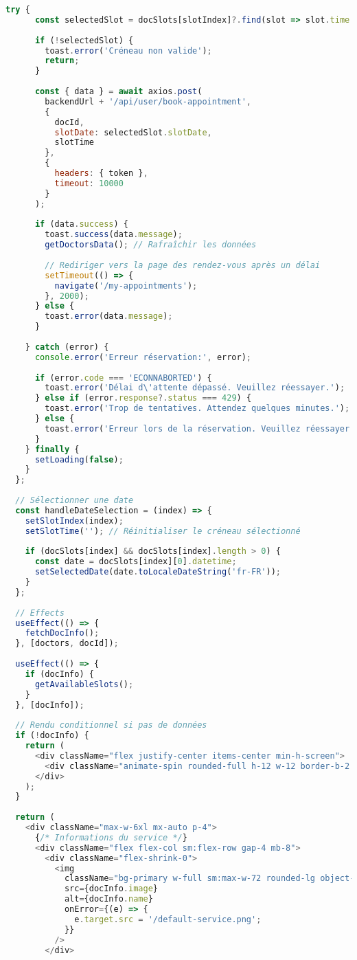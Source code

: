 \begin{lstlisting}[language=JavaScript, caption=AppointmentForm.jsx - Formulaire de réservation avec validation]
    try {
      const selectedSlot = docSlots[slotIndex]?.find(slot => slot.time === slotTime);
      
      if (!selectedSlot) {
        toast.error('Créneau non valide');
        return;
      }
      
      const { data } = await axios.post(
        backendUrl + '/api/user/book-appointment', 
        { 
          docId, 
          slotDate: selectedSlot.slotDate, 
          slotTime 
        }, 
        { 
          headers: { token },
          timeout: 10000
        }
      );
      
      if (data.success) {
        toast.success(data.message);
        getDoctorsData(); // Rafraîchir les données
        
        // Rediriger vers la page des rendez-vous après un délai
        setTimeout(() => {
          navigate('/my-appointments');
        }, 2000);
      } else {
        toast.error(data.message);
      }
      
    } catch (error) {
      console.error('Erreur réservation:', error);
      
      if (error.code === 'ECONNABORTED') {
        toast.error('Délai d\'attente dépassé. Veuillez réessayer.');
      } else if (error.response?.status === 429) {
        toast.error('Trop de tentatives. Attendez quelques minutes.');
      } else {
        toast.error('Erreur lors de la réservation. Veuillez réessayer.');
      }
    } finally {
      setLoading(false);
    }
  };
  
  // Sélectionner une date
  const handleDateSelection = (index) => {
    setSlotIndex(index);
    setSlotTime(''); // Réinitialiser le créneau sélectionné
    
    if (docSlots[index] && docSlots[index].length > 0) {
      const date = docSlots[index][0].datetime;
      setSelectedDate(date.toLocaleDateString('fr-FR'));
    }
  };
  
  // Effects
  useEffect(() => {
    fetchDocInfo();
  }, [doctors, docId]);
  
  useEffect(() => {
    if (docInfo) {
      getAvailableSlots();
    }
  }, [docInfo]);
  
  // Rendu conditionnel si pas de données
  if (!docInfo) {
    return (
      <div className="flex justify-center items-center min-h-screen">
        <div className="animate-spin rounded-full h-12 w-12 border-b-2 border-primary"></div>
      </div>
    );
  }
  
  return (
    <div className="max-w-6xl mx-auto p-4">
      {/* Informations du service */}
      <div className="flex flex-col sm:flex-row gap-4 mb-8">
        <div className="flex-shrink-0">
          <img 
            className="bg-primary w-full sm:max-w-72 rounded-lg object-cover h-72 sm:h-auto" 
            src={docInfo.image} 
            alt={docInfo.name}
            onError={(e) => {
              e.target.src = '/default-service.png';
            }}
          />
        </div>
        

\end{lstlisting}

